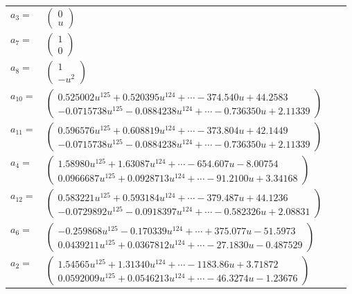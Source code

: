 \documentclass[1p]{elsarticle_modified}
\theoremstyle{definition}
\begin{document}
\begin{tabular}{m{7pt} m{180pt} m{7pt} m{180pt} }
\flushright $a_{3}=$&$\begin{pmatrix}0\\u\end{pmatrix}$ \\
\flushright $a_{7}=$&$\begin{pmatrix}1\\0\end{pmatrix}$ \\
\flushright $a_{8}=$&$\begin{pmatrix}1\\- u^2\end{pmatrix}$ \\
\flushright $a_{10}=$&$\begin{pmatrix}0.525002 u^{125}+0.520395 u^{124}+\cdots-374.540 u+44.2583\\-0.0715738 u^{125}-0.0884238 u^{124}+\cdots-0.736350 u+2.11339\end{pmatrix}$ \\
\flushright $a_{11}=$&$\begin{pmatrix}0.596576 u^{125}+0.608819 u^{124}+\cdots-373.804 u+42.1449\\-0.0715738 u^{125}-0.0884238 u^{124}+\cdots-0.736350 u+2.11339\end{pmatrix}$ \\
\flushright $a_{4}=$&$\begin{pmatrix}1.58980 u^{125}+1.63087 u^{124}+\cdots-654.607 u-8.00754\\0.0966687 u^{125}+0.0928713 u^{124}+\cdots-91.2100 u+3.34168\end{pmatrix}$ \\
\flushright $a_{12}=$&$\begin{pmatrix}0.583221 u^{125}+0.593184 u^{124}+\cdots-379.487 u+44.1236\\-0.0729892 u^{125}-0.0918397 u^{124}+\cdots-0.582326 u+2.08831\end{pmatrix}$ \\
\flushright $a_{6}=$&$\begin{pmatrix}-0.259868 u^{125}-0.170339 u^{124}+\cdots+375.077 u-51.5973\\0.0439211 u^{125}+0.0367812 u^{124}+\cdots-27.1830 u-0.487529\end{pmatrix}$ \\
\flushright $a_{2}=$&$\begin{pmatrix}1.54565 u^{125}+1.31340 u^{124}+\cdots-1183.86 u+3.71872\\0.0592009 u^{125}+0.0546213 u^{124}+\cdots-46.3274 u-1.23676\end{pmatrix}$ \\

\end{tabular}
\end{document}
